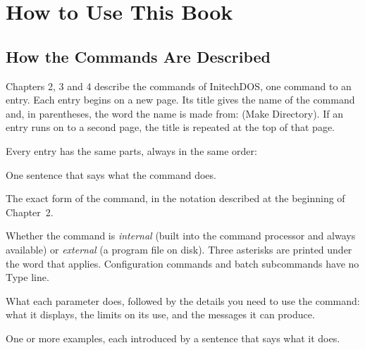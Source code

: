 \chapter{How to Use This Book}

\section{How the Commands Are Described}
Chapters 2, 3 and 4 describe the commands of InitechDOS, one command to an
entry.  Each entry begins on a new page.  Its title gives the name of the
command and, in parentheses, the word the name is made from: 
(Make Directory).  If an entry runs on to a second page, the title is
repeated at the top of that page.

Every entry has the same parts, always in the same order:

One sentence that says what the command does.

The exact form of the command, in the notation described
at the beginning of Chapter~2.

Whether the command is \emph{internal} (built into the
command processor and always available) or \emph{external} (a program file
on disk).  Three asterisks are printed under the word that applies.
Configuration commands and batch subcommands have no Type line.

What each parameter does, followed by the details you
need to use the command: what it displays, the limits on its use, and the
messages it can produce.

One or more examples, each introduced by a sentence that
says what it does.

